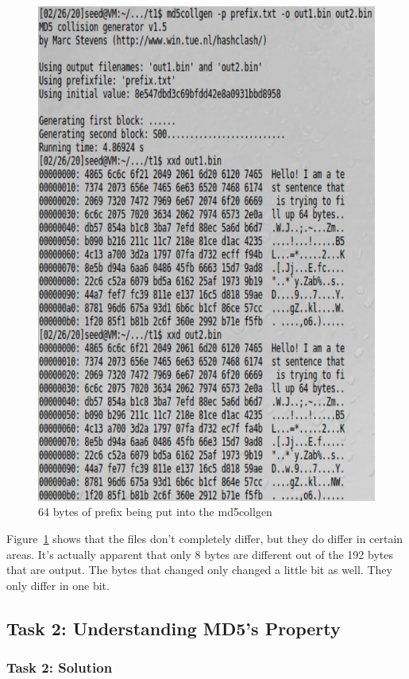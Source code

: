 \documentclass[12pt]{article}
\begin{document}
\begin{figure}[H]
	\begin{center}
		\includegraphics[scale=0.65]{pics/t1p1.png}
	\end{center}{}
	\caption{64 bytes of prefix being put into the md5collgen}
	\label{fig:t1p1}
\end{figure}

Figure~\ref{fig:t1p1} shows that the files don't completely differ, but they do differ in certain areas. It's actually apparent that only 8 bytes are different out of the 192 bytes that are output. The bytes that changed only changed a little bit as well. They only differ in one bit.


\subsection{Task 2: Understanding MD5's Property}
\subsubsection{Task 2: Solution}
\end{document}
